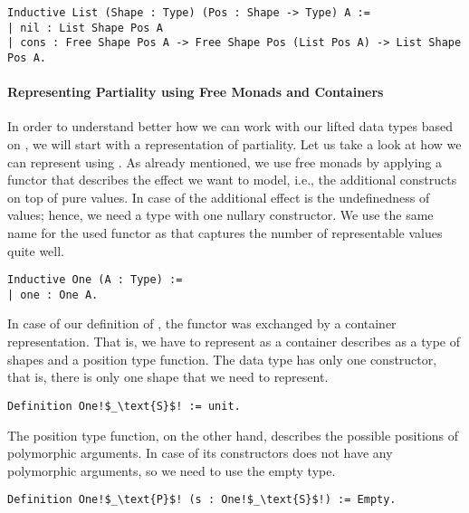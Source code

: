 \begin{verbatim}
Inductive List (Shape : Type) (Pos : Shape -> Type) A :=
| nil : List Shape Pos A
| cons : Free Shape Pos A -> Free Shape Pos (List Pos A) -> List Shape Pos A.
\end{verbatim}

\paragraph{Representing Partiality using Free Monads and Containers}
\label{par:partiality_container}

In order to understand better how we can work with our lifted data
types based on , we will start with a representation of
partiality.
Let us take a look at how we can represent  using
.
As already mentioned, we use free monads by applying a functor
 that describes the effect we want to model, i.e., the
additional constructs on top of pure values.
In case of  the additional effect is the undefinedness
of values; hence, we need a type with one nullary constructor.
We use the same name for the used functor as \citet{swierstra2008data}
that captures the number of representable values quite well.

\begin{verbatim}
Inductive One (A : Type) :=
| one : One A.
\end{verbatim}

In case of our definition of , the functor was exchanged by
a container representation.
That is, we have to represent  as a container
describes as a type of shapes and a position type function.
The data type  has only one constructor, that is,
there is only one shape that we need to represent.

\begin{verbatim}
Definition One!$_\text{S}$! := unit.
\end{verbatim}

The position type function, on the other hand, describes the possible
positions of polymorphic arguments.
In case of  its constructors does not have any
polymorphic arguments, so we need to use the empty type.

\begin{verbatim}
Definition One!$_\text{P}$! (s : One!$_\text{S}$!) := Empty.
\end{verbatim}

